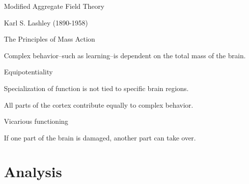 \begin{coloredlist}
    \item Modified Aggregate Field Theory
    \begin{coloredlist}
        \item Karl S. Lashley (1890-1958)
        \begin{coloredlist}
            \item The Principles of Mass Action
            \begin{coloredlist}
                \item Complex behavior--such as learning--is dependent on the total mass of the brain.
            \end{coloredlist}
            \item Equipotentiality
            \begin{coloredlist}
                \item Specialization of function is not tied to specific brain regions.
                \item All parts of the cortex contribute equally to complex behavior.
            \end{coloredlist}
            \item Vicarious functioning
            \begin{coloredlist}
                \item If one part of the brain is damaged, another part can take over.
            \end{coloredlist}
        \end{coloredlist}
    \end{coloredlist}
\end{coloredlist}


\section{Analysis}

